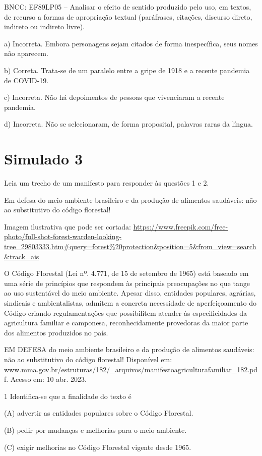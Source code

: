 \begin{itemize}
\begin{itemize}
{\begin{itemize}
\begin{itemize}
\begin{escolha}
\begin{escolha}
\begin{escolha}
\begin{escolha}
\begin{escolha}
BNCC: EF89LP05 -- Analisar o efeito de sentido produzido pelo uso, em
textos, de recurso a formas de apropriação textual (paráfrases,
citações, discurso direto, indireto ou indireto livre).

a) Incorreta. Embora personagens sejam citados de forma inespecífica,
seus nomes não aparecem.

b) Correta. Trata-se de um paralelo entre a gripe de 1918 e a recente
pandemia de COVID-19.

c) Incorreta. Não há depoimentos de pessoas que vivenciaram a recente
pandemia.

d) Incorreta. Não se selecionaram, de forma proposital, palavras raras
da língua.

\chapter{Simulado 3}

Leia um trecho de um manifesto para responder às questões 1 e 2.

Em defesa do meio ambiente brasileiro e da produção de alimentos
saudáveis: não ao substitutivo do código florestal!

Imagem ilustrativa que pode ser cortada:
\url{https://www.freepik.com/free-photo/full-shot-forest-warden-looking-tree_29803333.htm\#query=forest\%20protection\&position=5\&from_view=search\&track=ais}

O Código Florestal (Lei nº. 4.771, de 15 de setembro de 1965) está
baseado em uma série de princípios que respondem às principais
preocupações no que tange ao uso sustentável do meio ambiente. Apesar
disso, entidades populares, agrárias, sindicais e ambientalistas,
admitem a concreta necessidade de aperfeiçoamento do Código criando
regulamentações que possibilitem atender às especificidades da
agricultura familiar e camponesa, reconhecidamente provedoras da maior
parte dos alimentos produzidos no país.

EM DEFESA do meio ambiente brasileiro e da produção de alimentos
saudáveis: não ao substitutivo do código florestal! Disponível em:
www.mma.gov.br/estruturas/182/\_arquivos/manifestoagriculturafamiliar\_182.pdf.
Acesso em: 10 abr. 2023.

\num{1} Identifica-se que a finalidade do texto é

(A) advertir as entidades populares sobre o Código Florestal.

(B) pedir por mudanças e melhorias para o meio ambiente.

(C) exigir melhorias no Código Florestal vigente desde 1965.


\end{escolha}
\end{escolha}
\end{escolha}
\end{escolha}
\end{escolha}
\end{itemize}
\end{itemize}}
\end{itemize}
\end{itemize}
